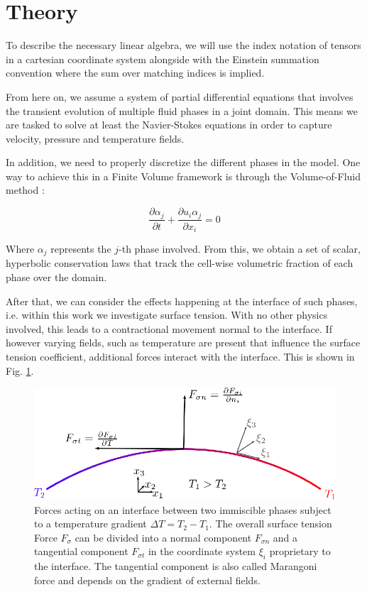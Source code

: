 \documentclass[conference,final,a4paper]{IEEEtran}
\begin{document}
\section{Theory}

To describe the necessary linear algebra, we will use the index notation of tensors in a cartesian coordinate system alongside with the Einstein summation convention where the sum over matching indices is implied.

From here on, we assume a system of partial differential equations that involves the transient evolution of multiple fluid phases in a joint domain. This means we are tasked to solve at least the Navier-Stokes equations in order to capture velocity, pressure and temperature fields.

In addition, we need to properly discretize the different phases in the model. One way to achieve this in a Finite Volume framework is through the Volume-of-Fluid method \cite{hirtVolumeFluidVOF1981}:

\begin{equation}
  \frac{\partial \alpha_{j}}{\partial t} + \frac{\partial u_{i} \alpha_{j}}{\partial x_{i}} = 0
\end{equation}

Where $\alpha_{j}$ represents the $j$-th phase involved. From this, we obtain a set of scalar, hyperbolic conservation laws that track the cell-wise volumetric fraction of each phase over the domain.

After that, we can consider the effects happening at the interface of such phases, i.e. within this work we investigate surface tension. With no other physics involved, this leads to a contractional movement normal to the interface. If however varying fields, such as temperature are present that influence the surface tension coefficient, additional forces interact with the interface. This is shown in Fig. \ref{fig:surface-tension}.

\begin{figure}[!tbp]
  \centering
  \includegraphics[width=\linewidth]{Figs/surface-tension.eps}
  \caption{Forces acting on an interface between two immiscible phases subject to a temperature gradient $\Delta T = T_{2} - T_{1}$. The overall surface tension Force $F_{\sigma}$ can be divided into a normal component $F_{\sigma n}$ and a tangential component $F_{\sigma t}$ in the coordinate system $\xi_{i}$ proprietary to the interface. The tangential component is also called Marangoni force and depends on the gradient of external fields.}
  \label{fig:surface-tension}
\end{figure}
\end{document}
